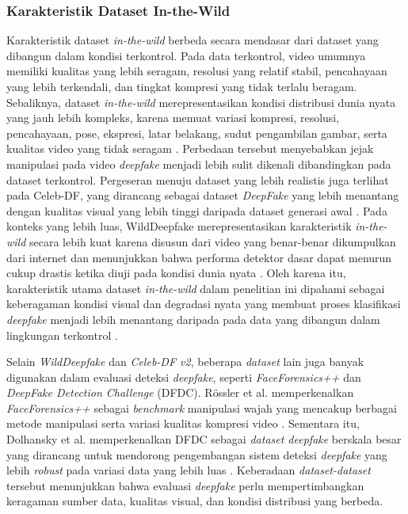 \subsubsection{Karakteristik Dataset In-the-Wild} \label{II.Teori1.3}
Karakteristik dataset \textit{in-the-wild} berbeda secara mendasar dari dataset yang dibangun dalam kondisi terkontrol. Pada data terkontrol, video umumnya memiliki kualitas yang lebih seragam, resolusi yang relatif stabil, pencahayaan yang lebih terkendali, dan tingkat kompresi yang tidak terlalu beragam. Sebaliknya, dataset \textit{in-the-wild} merepresentasikan kondisi distribusi dunia nyata yang jauh lebih kompleks, karena memuat variasi kompresi, resolusi, pencahayaan, pose, ekspresi, latar belakang, sudut pengambilan gambar, serta kualitas video yang tidak seragam \cite{Zi2024}\cite{li2020celebdflargescalechallengingdataset}. Perbedaan tersebut menyebabkan jejak manipulasi pada video \textit{deepfake} menjadi lebih sulit dikenali dibandingkan pada dataset terkontrol. Pergeseran menuju dataset yang lebih realistis juga terlihat pada Celeb-DF, yang dirancang sebagai dataset \textit{DeepFake} yang lebih menantang dengan kualitas visual yang lebih tinggi daripada dataset generasi awal \cite{li2020celebdflargescalechallengingdataset}. Pada konteks yang lebih luas, WildDeepfake merepresentasikan karakteristik \textit{in-the-wild} secara lebih kuat karena disusun dari video yang benar-benar dikumpulkan dari internet dan menunjukkan bahwa performa detektor dasar dapat menurun cukup drastis ketika diuji pada kondisi dunia nyata \cite{Zi2024}. Oleh karena itu, karakteristik utama dataset \textit{in-the-wild} dalam penelitian ini dipahami sebagai keberagaman kondisi visual dan degradasi nyata yang membuat proses klasifikasi \textit{deepfake} menjadi lebih menantang daripada pada data yang dibangun dalam lingkungan terkontrol \cite{Zi2024}\cite{li2020celebdflargescalechallengingdataset}. \par

Selain \textit{WildDeepfake} dan \textit{Celeb-DF v2}, beberapa \textit{dataset} lain juga banyak digunakan dalam evaluasi deteksi \textit{deepfake}, seperti \textit{FaceForensics++} dan \textit{DeepFake Detection Challenge} (DFDC). R{\"o}ssler et al. memperkenalkan \textit{FaceForensics++} sebagai \textit{benchmark} manipulasi wajah yang mencakup berbagai metode manipulasi serta variasi kualitas kompresi video \cite{rössler2019faceforensicslearningdetectmanipulated}. Sementara itu, Dolhansky et al. memperkenalkan DFDC sebagai \textit{dataset deepfake} berskala besar yang dirancang untuk mendorong pengembangan sistem deteksi \textit{deepfake} yang lebih \textit{robust} pada variasi data yang lebih luas \cite{dolhansky2020deepfakedetectionchallengedfdc}. Keberadaan \textit{dataset-dataset} tersebut menunjukkan bahwa evaluasi \textit{deepfake} perlu mempertimbangkan keragaman sumber data, kualitas visual, dan kondisi distribusi yang berbeda. \par

